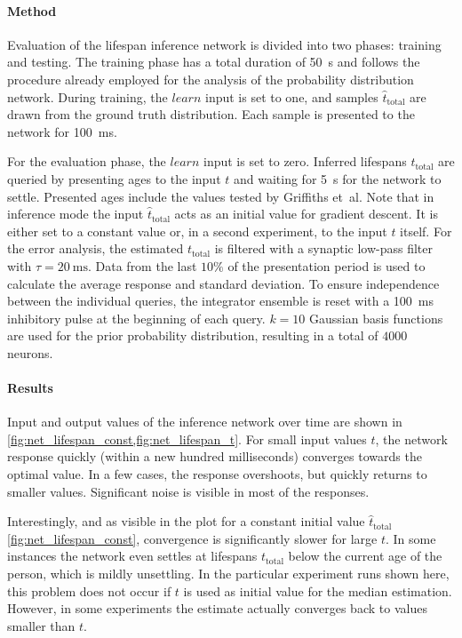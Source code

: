 \documentclass[a4paper,11pt]{article}
\begin{document}
\paragraph{Method}
Evaluation of the lifespan inference network is divided into two phases: training and testing. The training phase has a total duration of \SI{50}{\second} and follows the procedure already employed for the analysis of the probability distribution network. During training, the $\mathit{learn}$ input is set to one, and samples $\hat t_\mathrm{total}$ are drawn from the ground truth distribution. Each sample is presented to the network for \SI{100}{\milli\second}.

For the evaluation phase, the $\mathit{learn}$ input is set to zero. Inferred lifespans $t_\mathrm{total}$ are queried by presenting ages to the input $t$ and waiting for \SI{5}{\second} for the network to settle. Presented ages include the values tested by Griffiths et~al. Note that in inference mode the input $\hat t_\mathrm{total}$ acts as an initial value for gradient descent. It is either set to a constant value or, in a second experiment, to the input $t$ itself. For the error analysis, the estimated $t_\mathrm{total}$ is filtered with a synaptic low-pass filter with $\tau = \SI{20}{\milli\second}$. Data from the last $10\%$ of the presentation period is used to calculate the average response and standard deviation. To ensure independence between the individual queries, the integrator ensemble is reset with a \SI{100}{\milli\second} inhibitory pulse at the beginning of each query. $k = 10$ Gaussian basis functions are used for the prior probability distribution, resulting in a total of $4000$ neurons.

\paragraph{Results}
Input and output values of the inference network over time are shown in \cref{fig:net_lifespan_const,fig:net_lifespan_t}. For small input values $t$, the network response quickly (within a new hundred milliseconds) converges towards the optimal value. In a few cases, the response overshoots, but quickly returns to smaller values. Significant noise is visible in most of the responses.

Interestingly, and as visible in the plot for a constant initial value $\hat t_\mathrm{total}$ \cref{fig:net_lifespan_const}, convergence is significantly slower for large $t$. In some instances the network even settles at lifespans $t_\mathrm{total}$ below the current age of the person, which is mildly unsettling. In the particular experiment runs shown here, this problem does not occur if $t$ is used as initial value for the median estimation. However, in some experiments the estimate actually converges back to values smaller than $t$.
\end{document}
